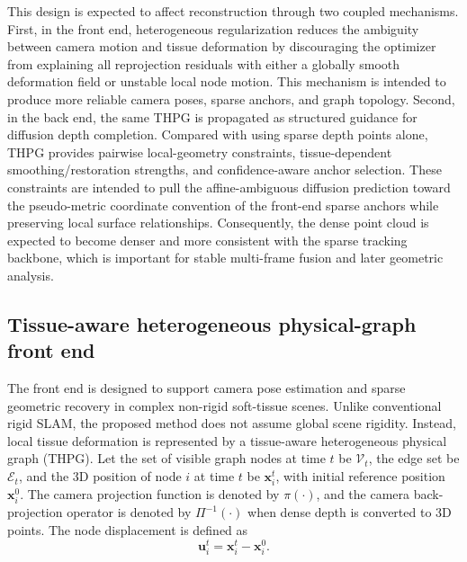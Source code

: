 \documentclass[pdflatex,sn-mathphys-num]{sn-jnl}
\begin{document}
This design is expected to affect reconstruction through two coupled mechanisms. First, in the front end, heterogeneous regularization reduces the ambiguity between camera motion and tissue deformation by discouraging the optimizer from explaining all reprojection residuals with either a globally smooth deformation field or unstable local node motion. This mechanism is intended to produce more reliable camera poses, sparse anchors, and graph topology. Second, in the back end, the same THPG is propagated as structured guidance for diffusion depth completion. Compared with using sparse depth points alone, THPG provides pairwise local-geometry constraints, tissue-dependent smoothing/restoration strengths, and confidence-aware anchor selection. These constraints are intended to pull the affine-ambiguous diffusion prediction toward the pseudo-metric coordinate convention of the front-end sparse anchors while preserving local surface relationships. Consequently, the dense point cloud is expected to become denser and more consistent with the sparse tracking backbone, which is important for stable multi-frame fusion and later geometric analysis.

\subsection{Tissue-aware heterogeneous physical-graph front end}\label{subsec:frontend}

The front end is designed to support camera pose estimation and sparse geometric recovery in complex non-rigid soft-tissue scenes. Unlike conventional rigid SLAM, the proposed method does not assume global scene rigidity. Instead, local tissue deformation is represented by a tissue-aware heterogeneous physical graph (THPG). Let the set of visible graph nodes at time $t$ be $\mathcal{V}_t$, the edge set be $\mathcal{E}_t$, and the 3D position of node $i$ at time $t$ be $\mathbf{x}_i^t$, with initial reference position $\mathbf{x}_i^0$. The camera projection function is denoted by $\pi(\cdot)$, and the camera back-projection operator is denoted by $\Pi^{-1}(\cdot)$ when dense depth is converted to 3D points. The node displacement is defined as
\begin{equation}
\mathbf{u}_i^t = \mathbf{x}_i^t - \mathbf{x}_i^0.
\label{eq:disp}
\end{equation}
\end{document}
